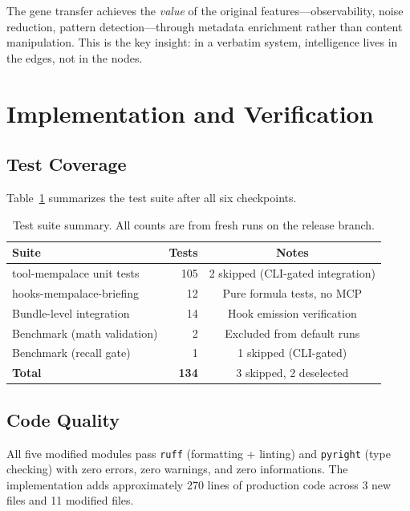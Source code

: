 \documentclass[11pt]{article}
\begin{document}
The gene transfer achieves the \emph{value} of the original
features---observability, noise reduction, pattern detection---through
metadata enrichment rather than content manipulation. This is the key
insight: in a verbatim system, intelligence lives in the edges, not in
the nodes.

\section{Implementation and Verification}

\subsection{Test Coverage}

Table~\ref{tab:tests} summarizes the test suite after all six
checkpoints.

\begin{table}[H]
\centering
\caption{Test suite summary. All counts are from fresh runs on the
release branch.}
\label{tab:tests}
\begin{tabular}{@{}lrc@{}}
\toprule
\textbf{Suite} & \textbf{Tests} & \textbf{Notes} \\
\midrule
tool-mempalace unit tests     & 105 & 2 skipped (CLI-gated integration) \\
hooks-mempalace-briefing      &  12 & Pure formula tests, no MCP \\
Bundle-level integration      &  14 & Hook emission verification \\
Benchmark (math validation)   &   2 & Excluded from default runs \\
Benchmark (recall gate)       &   1 & 1 skipped (CLI-gated) \\
\midrule
\textbf{Total}                & \textbf{134} & 3 skipped, 2 deselected \\
\bottomrule
\end{tabular}
\end{table}

\subsection{Code Quality}

All five modified modules pass \texttt{ruff} (formatting + linting) and
\texttt{pyright} (type checking) with zero errors, zero warnings, and
zero informations. The implementation adds approximately 270 lines of
production code across 3 new files and 11 modified files.
\end{document}
